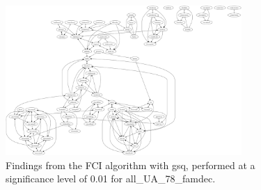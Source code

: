 \begin{figure}[htbp]
    \centering
    \includegraphics[width=0.8\textwidth]{Report/final_report/pictures/FCI_gsq_0.01_all_UA_78_famdec.png}
    \caption{Findings from the FCI algorithm with gsq, performed at a significance level of 0.01 for all_UA_78_famdec.}
    \label{fig:fci_gsq_0.01all_UA_78_famdec}
\end{figure}
